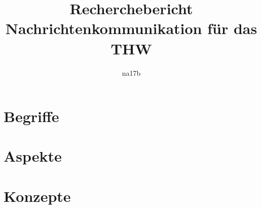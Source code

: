 \documentclass[a4paper,11pt,oneside, titlepage]{article}
\title{Recherchebericht\\Nachrichtenkommunikation für das THW}
\author{na17b}
\date{}
\begin{document}
\maketitle
\tableofcontents
\newpage
\section{Begriffe}














\section{Aspekte}








\section{Konzepte}








\end{document}
